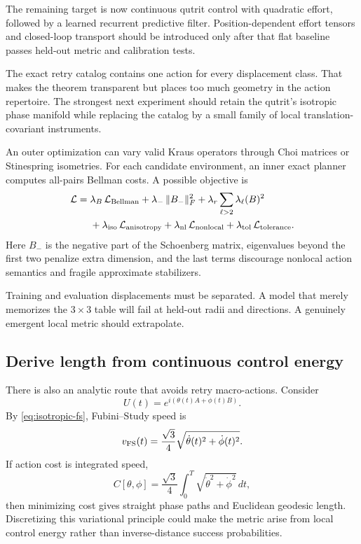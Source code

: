 \documentclass[11pt]{article}
\theoremstyle{definition}
\theoremstyle{remark}
\begin{document}
The remaining target is now continuous qutrit control with quadratic effort,
followed by a learned recurrent predictive filter.  Position-dependent effort
tensors and closed-loop transport should be introduced only after that flat
baseline passes held-out metric and calibration tests.

The exact retry catalog contains one action for every displacement class.
That makes the theorem transparent but places too much geometry in the action
repertoire. The strongest next experiment should retain the qutrit's isotropic
phase manifold while replacing the catalog by a small family of local
translation-covariant instruments.

An outer optimization can vary valid Kraus operators through Choi matrices or
Stinespring isometries. For each candidate environment, an inner exact planner
computes all-pairs Bellman costs. A possible objective is
\begin{equation}
\begin{split}
\mathcal L={}&
\lambda_B\,\mathcal L_{\rm Bellman}
+\lambda_-\,\|B_-\|_F^2
+\lambda_r\sum_{\ell>2}\lambda_\ell(B)^2\\
&+\lambda_{\rm iso}\,\mathcal L_{\rm anisotropy}
+\lambda_{\rm nl}\,\mathcal L_{\rm nonlocal}
+\lambda_{\rm tol}\,\mathcal L_{\rm tolerance}.
\end{split}
\label{eq:inverse-loss}
\end{equation}
Here $B_-$ is the negative part of the Schoenberg matrix, eigenvalues beyond
the first two penalize extra dimension, and the last terms discourage
nonlocal action semantics and fragile approximate stabilizers.

Training and evaluation displacements must be separated. A model that merely
memorizes the $3\times3$ table will fail at held-out radii and directions. A
genuinely emergent local metric should extrapolate.

\subsection{Derive length from continuous control energy}

There is also an analytic route that avoids retry macro-actions. Consider
\begin{equation}
 U(t)=e^{i(\theta(t)A+\phi(t)B)}.
\end{equation}
By \cref{eq:isotropic-fs}, Fubini--Study speed is
\begin{equation}
 v_{\rm FS}(t)=\frac{\sqrt3}{4}
 \sqrt{\dot\theta(t)^2+\dot\phi(t)^2}.
\end{equation}
If action cost is integrated speed,
\begin{equation}
 C[\theta,\phi]=
 \frac{\sqrt3}{4}\int_0^T
 \sqrt{\dot\theta^2+\dot\phi^2}\,dt,
 \label{eq:path-length}
\end{equation}
then minimizing cost gives straight phase paths and Euclidean geodesic
length. Discretizing this variational principle could make the metric arise
from local control energy rather than inverse-distance success probabilities.
\end{document}
